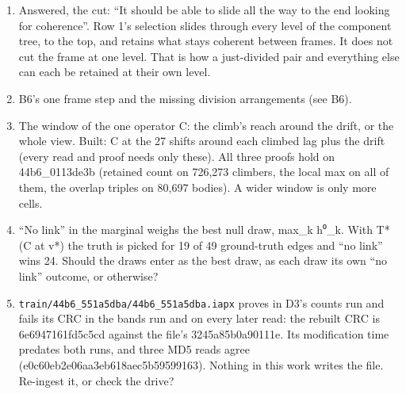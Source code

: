 \begin{enumerate}
\item Answered, the cut: “It should be able to slide all the way to the end looking for coherence”. Row 1's selection slides through every level of the component tree, to the top, and retains what stays coherent between frames. It does not cut the frame at one level. That is how a just-divided pair and everything else can each be retained at their own level.
\item B6's one frame step and the missing division arrangements (see B6).
\item The window of the one operator C: the climb's reach around the drift, or the whole view. Built: C at the 27 shifts around each climbed lag plus the drift (every read and proof needs only these). All three proofs hold on 44b6\_\allowbreak{}0113de3b (retained count on 726,273 climbers, the local max on all of them, the overlap triples on 80,697 bodies). A wider window is only more cells.
\item “No link” in the marginal weighs the best null draw, max\_\allowbreak{}k h⁰\_\allowbreak{}k. With T* (C at v*) the truth is picked for 19 of 49 ground-truth edges and “no link” wins 24. Should the draws enter as the best draw, as each draw its own “no link” outcome, or otherwise?
\item \texttt{train/\allowbreak{}44b6\_\allowbreak{}551a5dba/\allowbreak{}44b6\_\allowbreak{}551a5dba.\allowbreak{}iapx} proves in D3's counts run and fails its CRC in the bands run and on every later read: the rebuilt CRC is 6e6947161fd5c5cd against the file's 3245a85b0a90111e. Its modification time predates both runs, and three MD5 reads agree (e0c60eb2e06aa3eb618aec5b59599163). Nothing in this work writes the file. Re-ingest it, or check the drive?

\end{enumerate}
